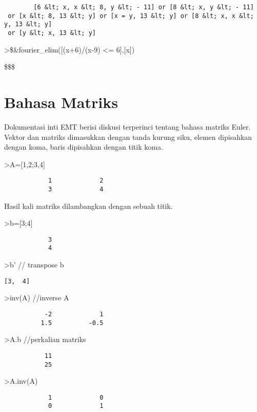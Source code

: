 \documentclass[
]{book}
\begin{document}
\begin{verbatim}
        [6 &lt; x, x &lt; 8, y &lt; - 11] or [8 &lt; x, y &lt; - 11]
 or [x &lt; 8, 13 &lt; y] or [x = y, 13 &lt; y] or [8 &lt; x, x &lt; y, 13 &lt; y]
 or [y &lt; x, 13 &lt; y]    
\end{verbatim}

\textgreater\$\&fourier\_elim({[}(x+6)/(x-9) \textless= 6{]},{[}x{]})

\$\left[ x=12 \right] \lor \left[ 12<x \right] \lor \left[ x<9   \right] \$\$

\section{Bahasa Matriks}\label{bahasa-matriks}

Dokumentasi inti EMT berisi diskusi terperinci tentang bahasa matriks Euler. Vektor dan matriks dimasukkan dengan tanda kurung siku, elemen dipisahkan dengan koma, baris dipisahkan dengan titik koma.

\textgreater A={[}1,2;3,4{]}

\begin{verbatim}
            1             2 
            3             4 
\end{verbatim}

Hasil kali matriks dilambangkan dengan sebuah titik.

\textgreater b={[}3;4{]}

\begin{verbatim}
            3 
            4 
\end{verbatim}

\textgreater b' // transpose b

\begin{verbatim}
[3,  4]
\end{verbatim}

\textgreater inv(A) //inverse A

\begin{verbatim}
           -2             1 
          1.5          -0.5 
\end{verbatim}

\textgreater A.b //perkalian matriks

\begin{verbatim}
           11 
           25 
\end{verbatim}

\textgreater A.inv(A)

\begin{verbatim}
            1             0 
            0             1 
\end{verbatim}
\end{document}
